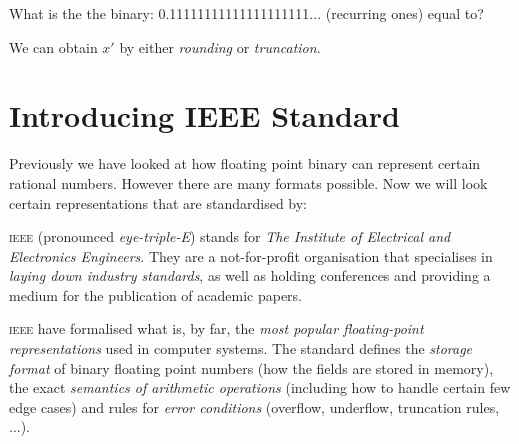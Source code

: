 \frmrule

\begin{example}
What is the the binary: 0.11111111111111111111... (recurring ones) equal to?
\end{example}


\frmrule

We can obtain $x'$ by either \textit{rounding} or \textit{truncation}.


\frmrule

\section{Introducing IEEE Standard}

Previously we have looked at how floating point binary can represent certain rational numbers. 
However there are many formats possible. 
Now we will look certain representations that are standardised by:


\textsc{ieee} (pronounced \textit{eye-triple-E})
stands for \textit{The Institute of Electrical and Electronics Engineers}. 
They are a not-for-profit organisation that specialises in \textit{laying down industry standards}, 
as well as holding conferences and providing a medium for the publication of academic papers. 

\textsc{ieee} have formalised what is, by far, the \textit{most popular floating-point representations}
used in computer systems. The standard defines the \textit{storage format} of binary floating point numbers 
(how the fields are stored in memory), the exact \textit{semantics of arithmetic operations} (including how to handle 
certain few edge cases) and rules for \textit{error conditions}
(overflow, underflow, truncation rules, ...).






